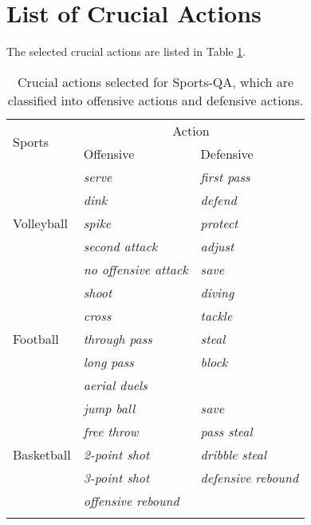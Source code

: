 \section*{List of Crucial Actions}

The selected crucial actions are listed in Table \ref{acts_}.

\begin{table}[tbp]
\caption{Crucial actions selected for Sports-QA, which are classified into offensive actions and defensive actions.} 
\label{acts_}

\begin{tabular}{@{}lll@{}}
\toprule
\multirow{2}{*}{Sports}     & \multicolumn{2}{c}{Action}                                \\ \cmidrule(l){2-3} 
                            & Offensive                    & Defensive                  \\ \midrule
\multirow{5}{*}{Volleyball} & \textit{serve}               & \textit{first pass}        \\
                            & \textit{dink}                & \textit{defend}            \\
                            & \textit{spike}               & \textit{protect}           \\
                            & \textit{second attack}       & \textit{adjust}            \\
                            & \textit{no offensive attack} & \textit{save}              \\ \midrule
\multirow{5}{*}{Football}   & \textit{shoot}               & \textit{diving}            \\
                            & \textit{cross}               & \textit{tackle}            \\
                            & \textit{through pass}        & \textit{steal}             \\
                            & \textit{long pass}           & \textit{block}             \\
                            & \textit{aerial duels}        & \textit{}                  \\ \midrule
\multirow{5}{*}{Basketball} & \textit{jump ball}           & \textit{save}              \\
                            & \textit{free throw}          & \textit{pass steal}        \\
                            & \textit{2-point shot}        & \textit{dribble steal}     \\
                            & \textit{3-point shot}        & \textit{defensive rebound} \\
                            & \textit{offensive rebound}   & \textit{}                  \\ \botrule
\end{tabular}
\end{table}

